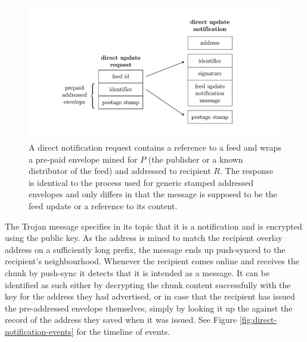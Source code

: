 \begin{figure}[htbp]
   \centering
   \includegraphics[width=\textwidth]{fig/direct-notification.pdf}
   \caption[Direct notification request and response \statusgreen]{A direct notification request contains a reference to a feed and wraps a pre-paid envelope mined for $P$ (the publisher or a known distributor of the feed) and addressed to recipient $R$. The response is identical to the process used for generic stamped addressed envelopes and only differs in that the message is supposed to be the feed update or a reference to its content.}
   \label{fig:direct-notification}
\end{figure}

The Trojan message specifies in its topic that it is a notification and is encrypted using the public key. As the address is mined to match the recipient overlay address on a sufficiently long prefix, the message ends up push-synced to the recipient's neighbourhood. Whenever the recipient comes online and receives the chunk by push-sync it detects that it is intended as a message. It can be identified as such either by decrypting the chunk content successfully with the key for the address they had advertised, or in case that the recipient has issued the pre-addressed envelope themselves, simply by looking it up the against the record of the address they saved when it was issued.  See Figure \ref{fig:direct-notification-events} for the timeline of events.


